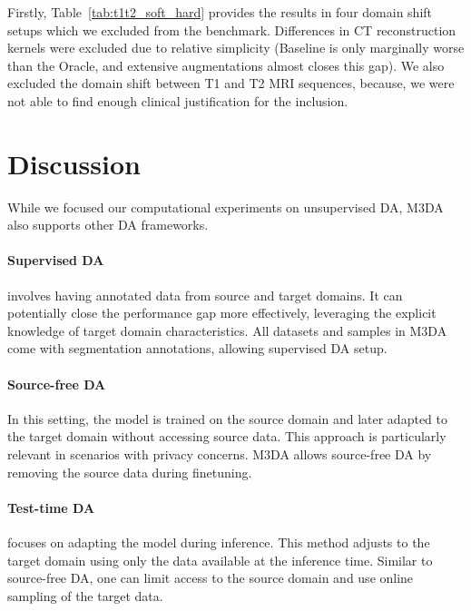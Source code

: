 Firstly, Table~\ref{tab:t1t2_soft_hard} provides the results in four domain shift setups which we excluded from the benchmark. Differences in CT reconstruction kernels were excluded due to relative simplicity (Baseline is only marginally worse than the Oracle, and extensive augmentations almost closes this gap). We also excluded the domain shift between T1 and T2 MRI sequences, because, we were not able to find enough clinical justification for the inclusion.





\section{Discussion}

While we focused our computational experiments on unsupervised DA, M3DA also supports other DA frameworks.

\paragraph{Supervised DA} involves having annotated data from source and target domains. It can potentially close the performance gap more effectively, leveraging the explicit knowledge of target domain characteristics. All datasets and samples in M3DA come with segmentation annotations, allowing supervised DA setup.

\paragraph{Source-free DA} In this setting, the model is trained on the source domain and later adapted to the target domain without accessing source data. This approach is particularly relevant in scenarios with privacy concerns. M3DA allows source-free DA by removing the source data during finetuning.

\paragraph{Test-time DA} focuses on adapting the model during inference. This method adjusts to the target domain using only the data available at the inference time. Similar to source-free DA, one can limit access to the source domain and use online sampling of the target data.


